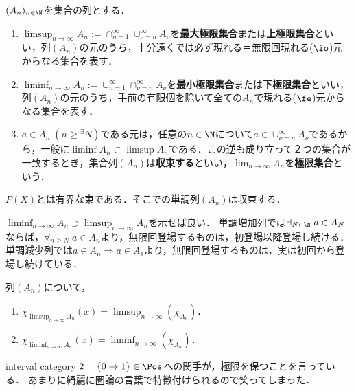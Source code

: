 \documentclass[uplatex, dvipdfmx]{jsreport}
\begin{document}
\begin{definition}
    $(A_n)_{n\in\N}$を集合の列とする．
    \begin{enumerate}
        \item $\limsup_{n\to\infty}A_n:=\cap^\infty_{n=1}\cup^\infty_{\nu=n}A_\nu$を\textbf{最大極限集合}または\textbf{上極限集合}といい，列$(A_n)$の元のうち，十分遠くでは必ず現れる＝無限回現れる($\io$)元からなる集合を表す．
        \item $\liminf_{n\to\infty}A_n:=\cup^\infty_{n=1}\cap^\infty_{\nu=n}A_\nu$を\textbf{最小極限集合}または\textbf{下極限集合}といい，列$(A_n)$の元のうち，手前の有限個を除いて全ての$A_n$で現れる($\fe$)元からなる集合を表す．
        \item $a\in A_n\;(n\ge{}^\exists N)$である元は，任意の$n\in\N$について$a\in\cup_{\nu=n}^\infty A_\nu$であるから，一般に$\liminf A_n\subset\limsup A_n$である．この逆も成り立って２つの集合が一致するとき，集合列$(A_n)$は\textbf{収束する}といい，$\lim_{n\to\infty}A_n$を\textbf{極限集合}という．
    \end{enumerate}
\end{definition}

\begin{lemma}[有界な単調列は収束する]\label{lemma-monotone-convergence}
    $P(X)$とは有界な束である．そこでの単調列$(A_n)$は収束する．
\end{lemma}
\begin{Proof}
    $\liminf_{n\to\infty}A_n\supset\limsup_{n\to\infty}A_n$を示せば良い．
    単調増加列では$\exists_{N\in\N}\;a\in A_N$ならば，$\forall_{n\ge N}\;a\in A_n$より，無限回登場するものは，初登場以降登場し続ける．
    単調減少列では$a\in A_n\Rightarrow a\in A_1$より，無限回登場するものは，実は初回から登場し続けている．
\end{Proof}

\begin{lemma}[極限集合の特性関数]
    列$(A_n)$について，
    \begin{enumerate}
        \item $\chi_{\limsup_{n\to\infty}A_n}(x)=\limsup_{n\to\infty}(\chi_{A_n})$．
        \item $\chi_{\liminf_{n\to\infty}A_n}(x)=\liminf_{n\to\infty}(\chi_{A_n})$．
    \end{enumerate}
\end{lemma}
\begin{remarks}
    interval category $2=\{0\to 1\}\in\Pos$への関手が，極限を保つことを言っている．
    あまりに綺麗に圏論の言葉で特徴付けられるので笑ってしまった．
\end{remarks}
\end{document}
